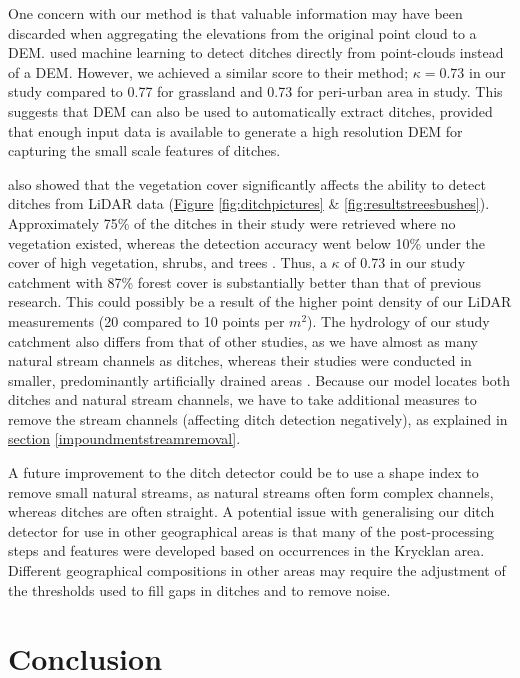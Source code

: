 \documentclass[11pt, review]{elsarticle} %
\begin{document}
One concern with our method is that valuable information may have been discarded when aggregating the elevations from the original point cloud to a DEM. \citet{roelens} used  machine learning to detect ditches directly from point-clouds instead of a DEM. However, we achieved a similar score to their method; $\kappa=0.73$ in our study compared to 0.77 for grassland and 0.73 for peri-urban area in \citet{roelens} study. This suggests that DEM can also be used to automatically extract ditches, provided that enough input data is available to generate a high resolution DEM for capturing the small scale features of ditches. 

\citet{bailly} also showed that the vegetation cover significantly affects the ability to detect ditches from LiDAR data (\hyperref[fig:ditchpictures]{Figure} \ref{fig:ditchpictures} \& \ref{fig:resultstreesbushes}). Approximately 75\% of the ditches in their study were retrieved where no vegetation existed, whereas the detection accuracy went below 10\% under the cover of high vegetation, shrubs, and trees \citep{bailly}. Thus, a $\kappa$ of 0.73 in our study catchment with 87\% forest cover \citep{krycklancatchment} is substantially better than that of previous research. This could possibly be a result of the higher point density of our LiDAR measurements (20 compared to 10 points per $m^{2}$). The hydrology of our study catchment also differs from that of other studies, as we have almost as many natural stream channels as ditches, whereas their studies were conducted in smaller, predominantly artificially drained areas \citep{bailly, roelens, rapinel}. Because our model locates both ditches and natural stream channels, we have to take additional measures to remove the stream channels (affecting ditch detection negatively), as explained in \hyperref[impoundmentstreamremoval]{section} \ref{impoundmentstreamremoval}.

A future improvement to the ditch detector could be to use a shape index to remove small natural streams, as natural streams often form complex channels, whereas ditches are often straight. A potential issue with generalising our ditch detector for use in other geographical areas is that many of the post-processing steps and features were developed based on occurrences in the Krycklan area. Different geographical compositions in other areas may require the adjustment of the thresholds used to fill gaps in ditches and to remove noise.

\section{Conclusion}
\end{document}
